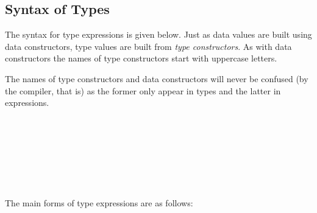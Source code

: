 \subsection{Syntax of Types}   \label{typesyntax}

The syntax for \frege{} type expressions is given below. Just as data values are built using data constructors, type values are built from \emph{type constructors}. As with data constructors the names of type constructors start with uppercase letters.

The names of type constructors and data constructors will never be confused (by the compiler, that is) as the former only appear in types and the latter in expressions.

\begin{flushleft}
  \sym{\arrow{}}  
  \alt {}\\
    
  \alt {}\\
  
  \alt {}           
  \alt \sym{(}  \sym{)}
  \alt \sym{(}  \sym{,}  \sym{)} 
  \alt \sym{\bracka{}}  \sym{\brackz{}}  
  \alt \sym{\bracea{}}  \sym{\bracez{}} \\
 
  \alt {} \sym{:}     
  \alt \sym{\bracea{}}  \sym{$|$}  \sym{\bracez{}} \\
 
  \alt \sym{\bracka\brackz}  
  \alt \sym{()}              
  \alt \sym{(}\more{\sym{,}}\sym{)} \\
  \sym{::}  
  \alt {} \\
 
\end{flushleft}

The main forms of type expressions are as follows:

